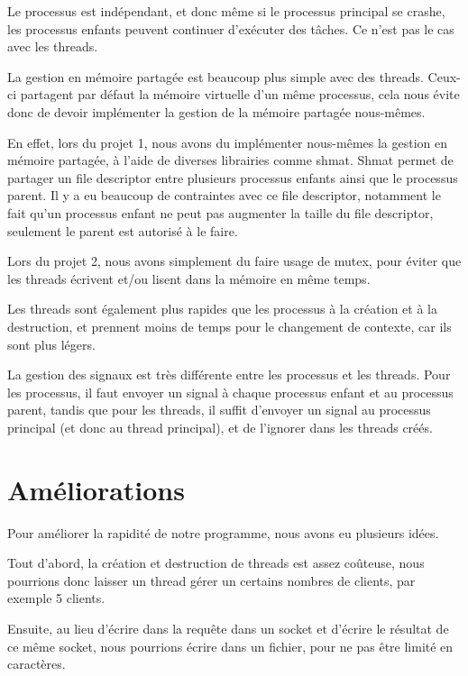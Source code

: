 \documentclass[utf8]{article}
\begin{document}
\begin{large}
Le processus est indépendant, et donc même si le processus principal se crashe,
les processus enfants peuvent continuer d'exécuter des tâches. Ce n'est pas le
cas avec les threads.

La gestion en mémoire partagée est beaucoup plus simple avec des threads.
Ceux-ci partagent par défaut la mémoire virtuelle d'un même processus, cela nous
évite donc de devoir implémenter la gestion de la mémoire partagée nous-mêmes.
\par
En effet, lors du projet 1, nous avons du implémenter nous-mêmes la gestion en
mémoire partagée, à l'aide de diverses librairies comme shmat. Shmat permet de
partager un file descriptor entre plusieurs processus enfants ainsi que le
processus parent. Il y a eu beaucoup de contraintes avec ce file descriptor,
notamment le fait qu'un processus enfant ne peut pas augmenter la taille du file
descriptor, seulement le parent est autorisé à le faire. 
\par
Lors du projet 2, nous
avons simplement du faire usage de mutex, pour éviter que les threads écrivent
et/ou lisent dans la mémoire en même temps.
\par
Les threads sont également plus rapides que les processus à la création et à la
destruction, et prennent moins de temps pour le changement de contexte, car ils
sont plus légers.\par La gestion des signaux est très différente entre les
processus et les threads. Pour les processus, il faut envoyer un signal à chaque
processus enfant et au processus parent, tandis que pour les threads, il suffit
d'envoyer un signal au processus principal (et donc au thread principal), et de
l'ignorer dans les threads créés.




\par
\section{Améliorations}
\par
\indent

Pour améliorer la rapidité de notre programme, nous avons eu plusieurs idées.

Tout d'abord, la création et destruction de threads est assez coûteuse, nous pourrions donc
laisser un thread gérer un certains nombres de clients, par exemple 5 clients.
\par

Ensuite, au lieu d'écrire dans la requête dans un socket et d'écrire le résultat
de ce même socket, nous pourrions écrire dans un fichier, pour ne pas être
limité en caractères.


\end{large}
\end{document}
